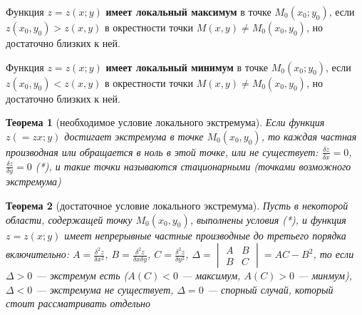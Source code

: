 \documentclass{article}
\newtheorem{theorem}{Теорема}
\begin{document}
\begin{flushleft}
Функция $z = z(x; y)$ \textbf{имеет локальный максимум} в точке $M_0(x_0; y_0)$, если $z(x_0, y_0) > z(x, y)$ в окрестности точки $M(x, y) \ne M_0(x_0, y_0)$, но достаточно близких к ней.

Функция $z = z(x; y)$ \textbf{имеет локальный минимум} в точке $M_0(x_0; y_0)$, если $z(x_0, y_0) < z(x, y)$ в окрестности точки $M(x, y) \ne M_0(x_0, y_0)$, но достаточно близких к ней.

\begin{theorem}[необходимое условие локального экстремума]
    Если функция $z( = zx; y)$ достигает экстремума в точке $M_0(x_0, y_0)$, то каждая частная производная или обращается в ноль в этой точке, или не существует: $\frac{\delta z}{\delta x} = 0$, $\frac{\delta z}{\delta y} = 0$ (*), и такие точки называются стационарными (точками возможного экстремума)
\end{theorem}

\begin{theorem}[достаточное условие локального экстремума]
    Пусть в некоторой области, содержащей точку $M_0(x_0, y_0)$, выполнены условия (*), и функция $z = z(x; y)$ имеет непрерывные частные производные до третьего порядка включительно: $A = \frac{\delta^2 z}{\delta x^2}$, $B = \frac{\delta^2 z}{\delta x \delta y}$, $C = \frac{\delta^2 z}{\delta y^2}$, $\Delta = \begin{vmatrix}
        A & B \\
        B & C
    \end{vmatrix} = AC - B^2$, то если $\Delta > 0$ — экстремум есть ($A(C) < 0$ — максимум, $A(C) > 0$ — минмум), $\Delta < 0$ — экстремума не существует, $\Delta = 0$ — спорный случай, который стоит рассматривать отдельно
\end{theorem}

\end{flushleft}
\end{document}
